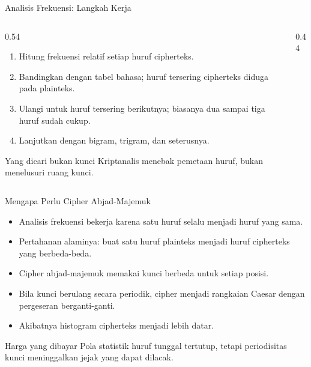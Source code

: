 \documentclass[aspectratio=169,11pt]{beamer}
\begin{document}
\begin{frame}{Analisis Frekuensi: Langkah Kerja}
    \begin{columns}[T,onlytextwidth]
        \begin{column}{0.54\textwidth}
            \footnotesize
            \begin{enumerate}
                \item Hitung frekuensi relatif setiap huruf cipherteks.
                \item Bandingkan dengan tabel bahasa; huruf tersering
                      cipherteks diduga  pada plainteks.
                \item Ulangi untuk huruf tersering berikutnya; biasanya dua
                      sampai tiga huruf sudah cukup.
                \item Lanjutkan dengan bigram, trigram, dan seterusnya.
            \end{enumerate}
            \begin{alertblock}{Yang dicari bukan kunci}
                \footnotesize
                Kriptanalis menebak pemetaan huruf, bukan menelusuri ruang
                kunci.
            \end{alertblock}
        \end{column}
        \begin{column}{0.44\textwidth}
            \centering
        \end{column}
    \end{columns}
\end{frame}

\begin{frame}{Mengapa Perlu Cipher Abjad-Majemuk}
    \footnotesize
    \begin{itemize}
        \item Analisis frekuensi bekerja karena satu huruf selalu menjadi
              huruf yang sama.
        \item Pertahanan alaminya: buat satu huruf plainteks menjadi
              huruf cipherteks yang berbeda-beda.
        \item Cipher abjad-majemuk memakai kunci berbeda untuk setiap posisi.
        \item Bila kunci berulang secara periodik, cipher menjadi rangkaian
              Caesar dengan pergeseran berganti-ganti.
        \item Akibatnya histogram cipherteks menjadi lebih datar.
    \end{itemize}
    \vspace{0.15cm}
    \begin{block}{Harga yang dibayar}
        \footnotesize
        Pola statistik huruf tunggal tertutup, tetapi periodisitas kunci
        meninggalkan jejak yang dapat dilacak.
    \end{block}
\end{frame}
\end{document}
